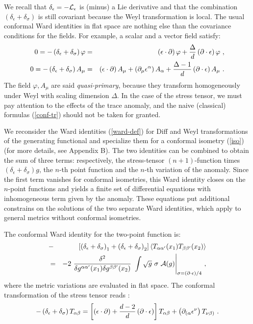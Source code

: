\documentclass[11pt]{article}
\newcommand{\beq}{\begin{equation}}
\newcommand{\eeq}{\end{equation}}
\newcommand{\bea}{\begin{eqnarray}}
\newcommand{\eea}{\end{eqnarray}}
\def\de{\partial}
\def\s{\sigma}
\def\a{\alpha}
\def\b{\beta}
\def\d{\delta}
\def\D{\Delta}
\def\eps{\epsilon}
\def\nl{\nonumber\\}
\def\bra{\langle}
\def\ket{\rangle}
\begin{document}
We recall that $\d_\eps =- {\cal L}_\eps$ is (minus)
a Lie derivative and that the combination $\left( \d_\eps +\d_\s \right)$
is still covariant because the Weyl transformation is local.
The usual conformal Ward identities in flat space \cite{cc} are
nothing else than the covariance conditions for the fields.
For example, a scalar and a vector field satisfy:
\bea
0= - \left(\d_\eps +\d_\s \right) \varphi &=& 
\left( \eps \cdot \de \right) \varphi + 
{\D\over d} \left( \de \cdot \eps \right) \varphi \ , 
\nl
0= - \left(\d_\eps +\d_\s \right) A_\mu &=& 
\left( \eps \cdot \de \right) A_\mu + \left( \de_\mu \eps^\a \right) A_\a +
{\D-1\over d} \left( \de \cdot \eps \right) A_\mu \ . 
\label{conf-tr}\eea
The field $\varphi, A_\mu$ are said {\it quasi-primary}, because they transform
homogeneously under Weyl with scaling dimension $\D$.
In the case of the stress tensor,
we must pay attention to the effects of the trace anomaly,
and the naive (classical) formulas (\ref{conf-tr}) should not
be taken for granted.

We reconsider the Ward identities (\ref{ward-def}) for Diff and Weyl 
transformations of the generating functional and specialize them
for a conformal isometry (\ref{iso}) (for more details, see Appendix B).
The two identities can be combined to obtain the sum of
three terms: respectively, the stress-tensor $(n+1)$-function 
times $(\d_\eps +\d_\s ) g$, the $n$-th point function
and the $n$-th variation of the anomaly. 
Since the first term vanishes for conformal isometries, this
Ward identity closes on the $n$-point functions and yields 
a finite set of differential equations with inhomogeneous term
given by the anomaly.
These equations put additional constrains on the solutions
of the two separate Ward identities, 
which apply to general metrics without conformal isometries.

The conformal Ward identity for the two-point function is:
\bea
&-& \left[ \left(\d_\eps +\d_\s \right)_1
       +\left(\d_\eps +\d_\s \right)_2 \right]
 \bra T_{\a\a'}(x_1) T_{\b\b'}(x_2)\ket 
\nl
&=& -2\ {\d^2 \over \d g^{\a\a'}(x_1) \d g^{\b\b'}(x_2)}\ 
\int\sqrt{g} \ \s\ {\cal A}(g) \Bigg\vert_{\s=(\de\cdot\eps)/4}\ ,
\label{2p-conf}
\eea
where the metric variations are evaluated in flat space.
The conformal transformation of the stress tensor reads \cite{cc}:
\beq
-\left(\d_\eps +\d_\s \right) T_{\a\b} =
\left[ \left(\eps\cdot \de\right) +{d-2\over d}\left(\de\cdot\eps\right)
\right] T_{\a\b} + \left(\de_{(\a} \eps^\nu \right) T_{\nu\b)}\ .
\label{conf-t}\eeq
\end{document}
